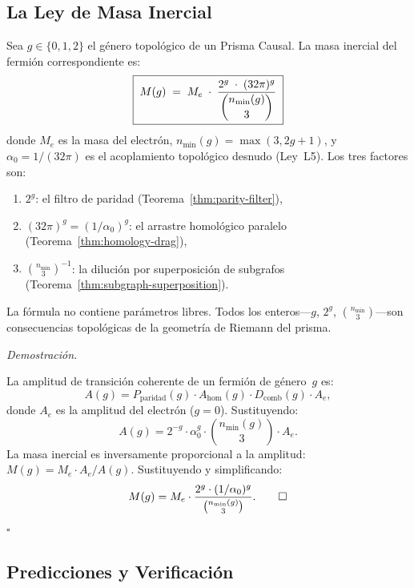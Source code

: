 \documentclass[11pt, a4paper, openany]{book}
\renewenvironment{proof}[1][Demostraci\'on]{%
  \par\noindent\textit{#1.}\quad
}{\hfill$\square$\par\medskip}
\begin{document}
\subsection{La Ley de Masa Inercial}

\begin{theorem}
\label{thm:mass-formula}
Sea $g \in \{0, 1, 2\}$ el g\'enero topol\'ogico de un Prisma Causal.
La masa inercial del fermi\'on correspondiente es:
\begin{equation}
  \boxed{\;
  M(g) \;=\; M_e \;\cdot\;
  \frac{2^g \;\cdot\; (32\pi)^g}
       {\dbinom{n_{\min}(g)}{3}}
  \;}
  \label{eq:mass-formula}
\end{equation}
donde $M_e$ es la masa del electr\'on, $n_{\min}(g) = \max(3, 2g+1)$,
y $\alpha_0 = 1/(32\pi)$ es el acoplamiento topol\'ogico desnudo
(Ley~L5). Los tres factores son:
\begin{enumerate}
  \item $2^g$: el filtro de paridad
        (Teorema~\ref{thm:parity-filter}),
  \item $(32\pi)^g = (1/\alpha_0)^g$: el arrastre homol\'ogico
        paralelo (Teorema~\ref{thm:homology-drag}),
  \item $\binom{n_{\min}}{3}^{-1}$: la diluci\'on por superposici\'on
        de subgrafos (Teorema~\ref{thm:subgraph-superposition}).
\end{enumerate}
La f\'ormula no contiene par\'ametros libres. Todos los
enteros---$g$, $2^g$, $\binom{n_{\min}}{3}$---son consecuencias
topol\'ogicas de la geometr\'ia de Riemann del prisma.
\end{theorem}

\begin{proof}
La amplitud de transici\'on coherente de un fermi\'on de g\'enero~$g$
es:
\[
  A(g) = P_{\mathrm{paridad}}(g) \cdot A_{\mathrm{hom}}(g) \cdot
         D_{\mathrm{comb}}(g) \cdot A_e,
\]
donde $A_e$ es la amplitud del electr\'on ($g=0$). Sustituyendo:
\[
  A(g) = 2^{-g} \cdot \alpha_0^g \cdot \binom{n_{\min}(g)}{3}
         \cdot A_e.
\]
La masa inercial es inversamente proporcional a la amplitud:
$M(g) = M_e \cdot A_e / A(g)$. Sustituyendo y simplificando:
\[
  M(g) = M_e \cdot \frac{2^g \cdot (1/\alpha_0)^g}
              {\binom{n_{\min}(g)}{3}}.  \qedhere
\]
\end{proof}

\subsection{Predicciones y Verificaci\'on}
\end{document}
